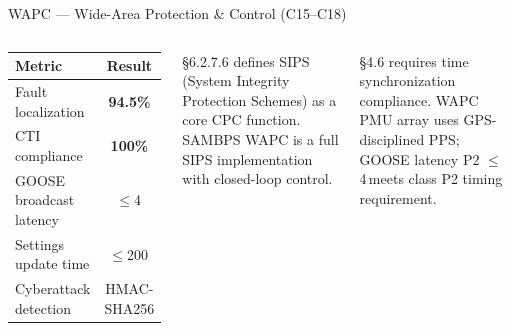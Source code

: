 \documentclass[aspectratio=169, 10pt]{beamer}
\newcommand{\ms}{\,\text{ms}}
\begin{document}
\begin{frame}{WAPC --- Wide-Area Protection \& Control (C15--C18)}
\begin{columns}[T]
\vspace{4pt}
\begin{tcolorbox}[resultbox, title={WAPC Performance}]
{\footnotesize
\begin{tabular}{lc}
\toprule
\textbf{Metric} & \textbf{Result}\\
\midrule
Fault localization        & \textbf{94.5\%}\\
CTI compliance            & \textbf{100\%}\\
GOOSE broadcast latency   & $\le$4\ms\\
Settings update time      & $\le$200\ms\\
Cyberattack detection     & HMAC-SHA256\\
\bottomrule
\end{tabular}}
\end{tcolorbox}
\vspace{6pt}
\begin{tcolorbox}[cpcbox, title={CPC Link --- C37.300 \S6.2.7.6}]
{\scriptsize \S6.2.7.6 defines SIPS (System Integrity Protection
Schemes) as a core CPC function. SAMBPS WAPC is a full SIPS
implementation with closed-loop control.}
\end{tcolorbox}
\vspace{5pt}
\begin{tcolorbox}[cpcbox, title={CPC Link --- C37.300 \S4.6}]
{\scriptsize \S4.6 requires time synchronization compliance.
WAPC PMU array uses GPS-disciplined PPS; GOOSE latency P2
$\le$4\ms meets class P2 timing requirement.}
\end{tcolorbox}
\end{columns}
\end{frame}
\end{document}
